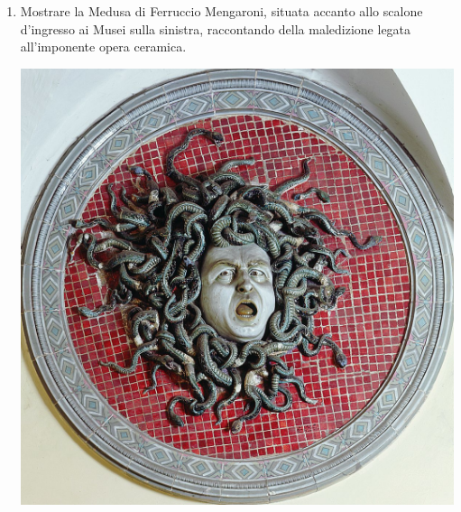 \documentclass[12pt,a4paper]{article}
\begin{document}
	\begin{enumerate}
		
	\item 	Mostrare la Medusa di Ferruccio Mengaroni, situata accanto allo scalone d'ingresso ai Musei sulla sinistra, raccontando della maledizione legata all'imponente opera ceramica.\par
	\begin{minipage}{\linewidth}
		\centering
		\includegraphics[]{Medusa.jpg}
	\end{minipage}
	

\end{enumerate}
\end{document}
